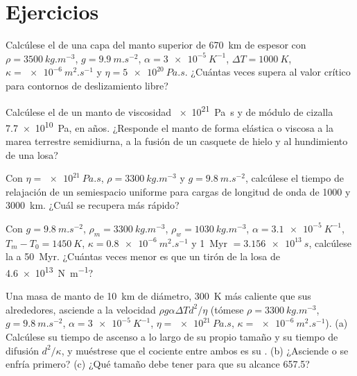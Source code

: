 \section{Ejercicios}

\begin{exercise}[$\star$]\label{exo:b3:mantle-convection:1}
Calcúlese el  de una capa del manto superior de \qty{670}{km} de espesor con
$\rho = \qty{3500}{kg.m^{-3}}$, $g = \qty{9.9}{m.s^{-2}}$, $\alpha =
\qty{3e-5}{K^{-1}}$, $\Delta T = \qty{1000}{K}$, $\kappa =
\qty{e-6}{m^2.s^{-1}}$ y $\eta = \qty{5e20}{Pa.s}$. ¿Cuántas veces supera al valor crítico
para contornos de deslizamiento libre?
\end{exercise}

\begin{exercise}[$\star$]\label{exo:b3:mantle-convection:2}
Calcúlese el  de un manto de viscosidad \qty{e21}{Pa.s} y de módulo de
cizalla \qty{7.7e10}{Pa}, en años. ¿Responde el manto de forma elástica o viscosa a la marea
terrestre semidiurna, a la fusión de un casquete de hielo y al
hundimiento de una losa?
\end{exercise}

\begin{exercise}[$\star$]\label{exo:b3:mantle-convection:3}
Con $\eta = \qty{e21}{Pa.s}$, $\rho = \qty{3300}{kg.m^{-3}}$ y $g =
\qty{9.8}{m.s^{-2}}$, calcúlese el tiempo de relajación de un semiespacio uniforme para
cargas de longitud de onda de 1000 y \qty{3000}{km}. ¿Cuál se recupera más rápido?
\end{exercise}

\begin{exercise}[$\star$]\label{exo:b3:mantle-convection:4}
Con $g = \qty{9.8}{m.s^{-2}}$, $\rho_m = \qty{3300}{kg.m^{-3}}$, $\rho_w =
\qty{1030}{kg.m^{-3}}$, $\alpha = \qty{3.1e-5}{K^{-1}}$, $T_m - T_0 =
\qty{1450}{K}$, $\kappa = \qty{0.8e-6}{m^2.s^{-1}}$ y \qty{1}{Myr} $=
\qty{3.156e13}{s}$, calcúlese la  a \qty{50}{Myr}. ¿Cuántas veces
menor es que un tirón de la losa de \qty{4.6e13}{N.m^{-1}}?
\end{exercise}

\begin{exercise}[$\star\star$]\label{exo:b3:mantle-convection:5}
Una masa de manto de \qty{10}{km} de diámetro, \qty{300}{K} más caliente que sus
alrededores, asciende a la velocidad $\rho g\alpha\Delta Td^2/\eta$ (tómese $\rho =
\qty{3300}{kg.m^{-3}}$, $g = \qty{9.8}{m.s^{-2}}$, $\alpha = \qty{3e-5}{K^{-1}}$,
$\eta = \qty{e21}{Pa.s}$, $\kappa = \qty{e-6}{m^2.s^{-1}}$). (a) Calcúlese su
tiempo de ascenso a lo largo de su propio tamaño y su tiempo de difusión $d^2/\kappa$, y muéstrese
que el cociente entre ambos es su . (b) ¿Asciende o se enfría primero? (c)
¿Qué tamaño debe tener para que su  alcance 657.5?
\end{exercise}

